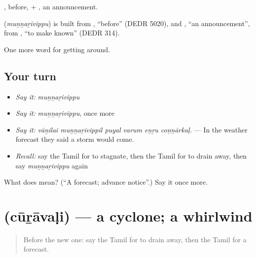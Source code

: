 , before, + , an announcement.

\begin{cousinweb}
\textbf{} (\emph{muṉṉaṟivippu}) is built from , \textquotedblleft{}before\textquotedblright{} (DEDR 5020), and , \textquotedblleft{}an announcement\textquotedblright{}, from , \textquotedblleft{}to make known\textquotedblright{} (DEDR 314).
\end{cousinweb}

\begin{grammarlens}[title={What you've built}]
One more word for getting around.
\end{grammarlens}

\subsection*{Your turn}
\begin{itemize}
\raggedright
  \item \emph{Say it:} \emph{muṉṉaṟivippu}
  \item \emph{Say it:} \emph{muṉṉaṟivippu}, once more
  \item \emph{Say it:} \emph{vāṉilai muṉṉaṟivippil puyal varum eṉṟu coṉṉārkaḷ.} — In the weather forecast they said a storm would come.
  \item \emph{Recall:} say the Tamil for to stagnate, then the Tamil for to drain away, then say \emph{muṉṉaṟivippu} again
\end{itemize}

\begin{tcolorbox}[breakable,colback=teal!4,colframe=teal!35!black,title={Before you move on}]
What does  mean? (\textquotedblleft{}A forecast; advance notice\textquotedblright{}.) Say it once more.
\end{tcolorbox}
\section[\texorpdfstring{\ta{சூறாவளி} (cūṟāvaḷi)}{சூறாவளி (cūṟāvaḷi)}]{ (cūṟāvaḷi) — a cyclone; a whirlwind}

\label{lesson:TA-C429-curavali}



\begin{quote}
Before the new one: say the Tamil for to drain away, then the Tamil for a forecast.
\end{quote}

